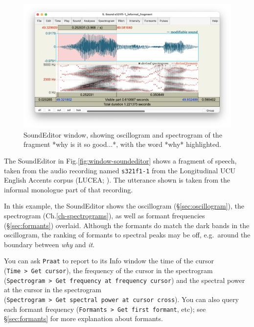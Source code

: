 \documentclass[
]{book}
\begin{document}
\begin{figure}

{\centering \includegraphics{figures/s321f1-1_informal_fragment_SoundEditor20250203} 

}

\caption{SoundEditor window, showing oscillogram and spectrogram of the fragment *why is it so good...*, with the word *why* highlighted.}\label{fig:window-soundeditor-3}
\end{figure}

\label{box-windowsfile-details-again}
The SoundEditor in Fig.\ref{fig:window-soundeditor} shows a fragment of speech, taken from the audio recording named \texttt{s321f1-1} from the Longitudinal UCU English Accents corpus (LUCEA; \citet{Orr_Quené_2017}). The utterance shown is taken from the informal monologue part of that recording.

In this example, the SoundEditor shows the oscillogram (§\ref{sec:oscillogram}), the spectrogram (Ch.\ref{ch-spectrograms}), as well as formant frequencies (§\ref{sec:formants}) overlaid. Although the formants do match the dark bands in the oscillogram, the ranking of formants to spectral peaks may be off, e.g.~around the boundary between \emph{why} and \emph{it}.

You can ask \texttt{Praat} to report to its Info window the time of the cursor (\texttt{Time\ \textgreater{}\ Get\ cursor}), the frequency of the cursor in the spectrogram (\texttt{Spectrogram\ \textgreater{}\ Get\ frequency\ at\ frequency\ cursor}) and the spectral power at the cursor in the spectrogram (\texttt{Spectrogram\ \textgreater{}\ Get\ spectral\ power\ at\ cursor\ cross}). You can also query each formant frequency (\texttt{Formants\ \textgreater{}\ Get\ first\ formant}, etc); see §\ref{sec:formants} for more explanation about formants.
\end{document}
